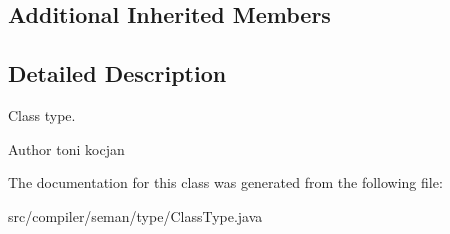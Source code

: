 \subsection*{Additional Inherited Members}


\subsection{Detailed Description}
Class type. \begin{DoxyAuthor}{Author}
toni kocjan 
\end{DoxyAuthor}


The documentation for this class was generated from the following file\+:\begin{DoxyCompactItemize}
\item 
src/compiler/seman/type/Class\+Type.\+java\end{DoxyCompactItemize}
